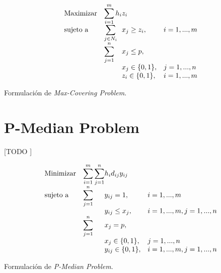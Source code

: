 \documentclass[spanish]{article}
\begin{document}
		\begin{eqfloat}
			\begin{equation}
				\begin{array}{ll@{}ll}
					\text{Maximizar}
						& \displaystyle\sum\limits_{i = 1}^{m} h_{i} & z_{i} 			&							\\
					\text{sujeto a}
						& \displaystyle\sum\limits_{j \in N_i}& x_{j} \geq z_i,		&i=1 ,..., m	\\
						& \displaystyle\sum\limits_{j = 1}^n 	& x_{j} \leq p,  		& 						\\
						&                                     &	x_{j} \in \{0,1\},&j=1 ,..., n 	\\
						&                                     &	z_{i} \in \{0,1\},&i=1 ,..., m  \\
				\end{array}
			\end{equation}
			\caption{Formulación de \emph{Max-Covering Problem}.}
			\label{eq:max_covering}
		\end{eqfloat}


	\section{P-Median Problem}
	\label{sec:e-8}

		\paragraph{}
		[TODO ]


		\begin{eqfloat}
			\begin{equation}
				\begin{array}{ll@{}ll}
					\text{Minimizar}
						& \displaystyle\sum\limits_{i = 1}^m
							\displaystyle\sum\limits_{j = 1}^n	& h_i d_{ij} y_{ij}	&							\\
					\text{sujeto a}
						& \displaystyle\sum\limits_{j = 1}^n 	& y_{ij} = 1,		& i = 1,..., m	\\
						& 																	 	& y_{ij} \leq x_{j},  		& i=1 ,..., m,j=1 ,..., n  \\
						& \displaystyle\sum\limits_{j = 1}^n 	& x_{j} = p,  		& 						\\
						&                                     &	x_{j} \in \{0,1\},&j=1 ,..., n 	\\
						&                                     &	y_{ij} \in \{0,1\},&i=1 ,..., m, j=1 ,..., n  \\
				\end{array}
			\end{equation}
			\caption{Formulación de \emph{P-Median Problem}.}
      \label{eq:p_median}
    \end{eqfloat}


	\nocite{subject:mio}
	\nocite{garciparedes:mosel-examples}
	
  
\end{document}
